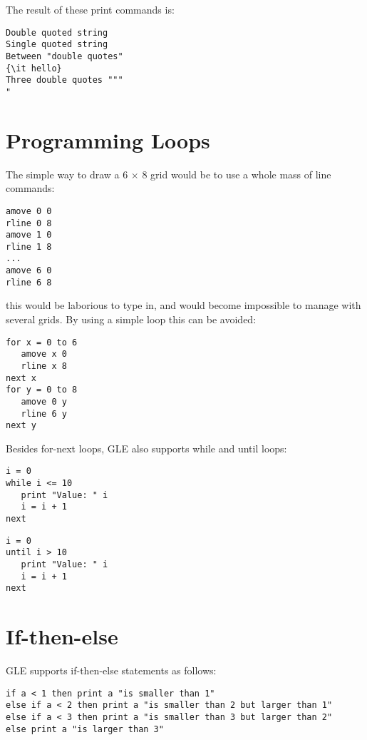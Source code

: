 The result of these print commands is:

\preglecode{}
\begin{Verbatim}
Double quoted string
Single quoted string
Between "double quotes"
{\it hello}
Three double quotes """
"
\end{Verbatim}
\postglecode{}

\section{Programming Loops}

The simple way to draw a 6 $\times$ 8 grid would be to use a whole mass 
of line commands:

\preglecode{}
\begin{Verbatim}
amove 0 0 
rline 0 8 
amove 1 0 
rline 1 8 
...
amove 6 0 
rline 6 8
\end{Verbatim}
\postglecode{}

this would be laborious to type in, and would become 
impossible to manage with several grids.  By using a simple loop
this can be avoided:

\preglecode{}
\begin{Verbatim}
for x = 0 to 6
   amove x 0 
   rline x 8 
next x
for y = 0 to 8
   amove 0 y 
   rline 6 y 
next y 
\end{Verbatim}
\postglecode{}

Besides for-next loops, GLE also supports while and until loops:

\preglecode{}
\begin{Verbatim}
i = 0
while i <= 10
   print "Value: " i
   i = i + 1
next
\end{Verbatim}
\postglecode{}

\preglecode{}
\begin{Verbatim}
i = 0
until i > 10
   print "Value: " i
   i = i + 1
next
\end{Verbatim}
\postglecode{}

\section{If-then-else}

GLE supports if-then-else statements as follows:

\preglecode{}
\begin{Verbatim}
if a < 1 then print a "is smaller than 1"
else if a < 2 then print a "is smaller than 2 but larger than 1"
else if a < 3 then print a "is smaller than 3 but larger than 2"
else print a "is larger than 3"
\end{Verbatim}
\postglecode{}

